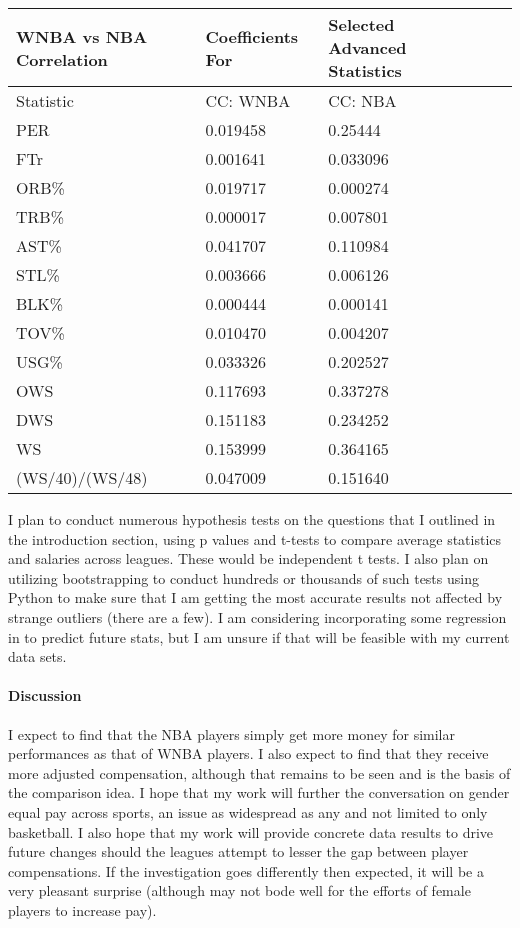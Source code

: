 \documentclass[12pt]{article}
\begin{document}
\begin{tabular}{*5l}    \toprule
WNBA vs NBA Correlation & Coefficients For & Selected Advanced Statistics \\\midrule

Statistic 
&  CC: WNBA   & CC: NBA \\ 

 PER  &  0.019458  & 0.25444 \\
 FTr   &  0.001641   & 0.033096        \\       
 ORB\%   &  0.019717   & 0.000274       \\         
 TRB\%   &  0.000017   & 0.007801        \\
 AST\%   &  0.041707   & 0.110984         \\
 STL\%  &  0.003666   & 0.006126        \\    
 BLK\%  & 0.000444    & 0.000141      \\
 TOV\%  & 0.010470   & 0.004207     \\
 USG\%   & 0.033326    & 0.202527        \\
 OWS   & 0.117693    & 0.337278        \\
 DWS  & 0.151183    & 0.234252         \\
 WS   &  0.153999  & 0.364165                  \\
 (WS/40)/(WS/48)   &  0.047009   & 0.151640        \\
 \hline
\end{tabular}
\newline
\par
I plan to conduct numerous hypothesis tests on the questions that I outlined in the introduction 
section, using p values and t-tests to compare average statistics and salaries across leagues. 
These would be independent t tests. I also plan on utilizing bootstrapping to conduct hundreds 
or thousands of such tests using Python to make sure that I am getting the most accurate results 
not affected by strange outliers (there are a few). I am considering incorporating some regression 
in to predict future stats, but I am unsure if that will be feasible with my current data sets.




\paragraph{Discussion}
I expect to find that the NBA players simply get more money for similar performances as that of WNBA 
players. I also expect to find that they receive more adjusted compensation, although that remains to 
be seen and is the basis of the comparison idea. I hope that my work will further the conversation on 
gender equal pay across sports, an issue as widespread as any and not limited to only basketball. 
I also hope that my work will provide concrete data results to drive future changes should the leagues 
attempt to lesser the gap between player compensations. If the investigation goes differently then 
expected, it will be a very pleasant surprise (although may not bode well for the efforts of female 
players to increase pay).
\end{document}
